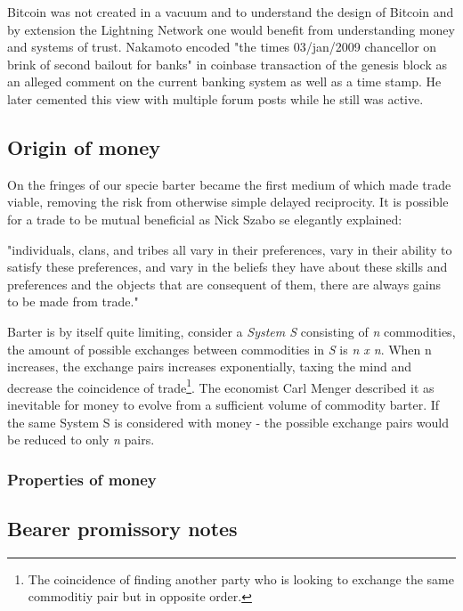 Bitcoin was not created in a vacuum and to understand the design of Bitcoin and by extension the Lightning Network one would
benefit from understanding money and systems of trust. Nakamoto encoded "the times 03/jan/2009 chancellor on brink of second bailout for banks"\cite{repository:bitcoin:sourceforge}\cite{bitcoin:genesis:coinbase} in coinbase transaction of the genesis block as an alleged comment on the current banking system as well as a time stamp. He later cemented this view with multiple forum posts while he still was active.

\subsection{Origin of money}

On the fringes of our specie barter became the first
medium of which made trade viable, removing the risk 
from otherwise simple delayed reciprocity. It is possible
for a trade to be mutual beneficial as Nick Szabo 
se elegantly explained:

\begin{displayquote}
"individuals, clans, and tribes all vary in their preferences, vary in their ability to satisfy these preferences, and vary in the beliefs they have about these skills and preferences and the objects that are consequent of them, there are always gains to be made from trade."\cite{szabo:shelling:out}
\end{displayquote}

Barter is by itself quite limiting, consider a \textit{System S}
consisting of \textit{n} commodities, the amount of possible exchanges
between commodities in \textit{S} is \textit{n x n}. When n increases, the exchange pairs increases exponentially,
taxing the mind and decrease the coincidence of trade\footnote{The coincidence of finding another party who is looking to exchange the same commoditiy pair but in opposite order.}. 
The economist Carl Menger described it as inevitable for money to evolve from a sufficient volume of
commodity barter\cite{menger:origins:money}. If the same System S is considered with money - the possible exchange pairs would be reduced to only \textit{n} pairs. 

\subsubsection{Properties of money}

\subsection{Bearer promissory notes}

